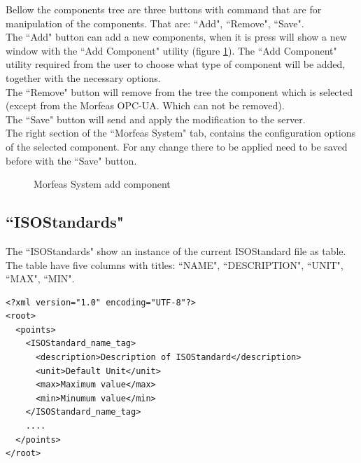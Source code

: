 Bellow the components tree are three buttons with command that are for manipulation of the components.
That are: ``Add", ``Remove", ``Save".\\

\noindent The ``Add" button can add a new components, when it is press will show a new window with the ``Add Component" utility
(figure \ref{fig:Morfeas_sys_conf_add_comp}).
The ``Add Component" utility required from the user to choose what type of component will be added, together with the necessary options.\\

\noindent The ``Remove" button will remove from the tree the component which is selected (except from the Morfeas OPC-UA. Which can not be removed).\\

\noindent The ``Save" button will send and apply the modification to the server.\\

The right section of the ``Morfeas System" tab, contains the configuration options of the selected component.
For any change there to be applied need to be saved before with the ``Save" button.

\begin{figure}[h]
\centering
	\caption{Morfeas System add component}
	\label{fig:Morfeas_sys_conf_add_comp}
\end{figure}

\newpage
\subsection{``ISOStandards"}
The ``ISOStandards" show an instance of the current ISOStandard file as table.
The table have five columns with titles: ``NAME", ``DESCRIPTION", ``UNIT", ``MAX", ``MIN".


\begin{lstlisting}[frame=single,caption=Structure of ISOstandard file,label=lst:ISOStandard]
<?xml version="1.0" encoding="UTF-8"?>
<root>
  <points>
    <ISOStandard_name_tag>
      <description>Description of ISOStandard</description>
      <unit>Default Unit</unit>
      <max>Maximum value</max>
      <min>Minumum value</min>
    </ISOStandard_name_tag>
    ....
  </points>
</root>
\end{lstlisting}

